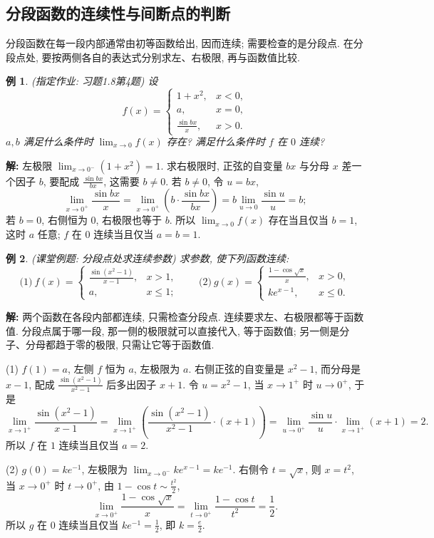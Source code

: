 \documentclass[UTF8,openany]{ctexbook}
\theoremstyle{chinesetextbook}
\newtheorem{example}{例}[section]
\newenvironment{cnsolution}{\par\indent\textbf{解:} \ignorespaces}{\par}
\begin{document}
\subsection{分段函数的连续性与间断点的判断}
分段函数在每一段内部通常由初等函数给出, 因而连续; 需要检查的是分段点. 在分段点处, 要按两侧各自的表达式分别求左、右极限, 再与函数值比较.
\begin{example}
\textnormal{(指定作业: 习题1.8第4题)} 设
\[
f(x)=\begin{cases}1+x^2,&x<0,\\a,&x=0,\\\frac{\sin bx}x,&x>0.\end{cases}
\]
$a,b$ 满足什么条件时 $\displaystyle\lim_{x\to0}f(x)$ 存在? 满足什么条件时 $f$ 在 $0$ 连续?
\end{example}
\begin{cnsolution}
左极限 $\displaystyle\lim_{x\to0^-}(1+x^2)=1$. 求右极限时, 正弦的自变量 $bx$ 与分母 $x$ 差一个因子 $b$, 要配成 $\displaystyle\frac{\sin bx}{bx}$, 这需要 $b\ne0$. 若 $b\ne0$, 令 $u=bx$,
\[
\lim_{x\to0^+}\frac{\sin bx}x=\lim_{x\to0^+}\left(b\cdot\frac{\sin bx}{bx}\right)=b\lim_{u\to0}\frac{\sin u}u=b;
\]
若 $b=0$, 右侧恒为 $0$, 右极限也等于 $b$. 所以 $\displaystyle\lim_{x\to0}f(x)$ 存在当且仅当 $b=1$, 这时 $a$ 任意; $f$ 在 $0$ 连续当且仅当 $a=b=1$.
\end{cnsolution}
\begin{example}
\textnormal{(课堂例题: 分段点处求连续参数)} 求参数, 使下列函数连续:
\[
\text{(1)}\ f(x)=\begin{cases}\frac{\sin(x^2-1)}{x-1},&x>1,\\a,&x\le1;\end{cases}\qquad\text{(2)}\ g(x)=\begin{cases}\frac{1-\cos\sqrt x}x,&x>0,\\ke^{x-1},&x\le0.\end{cases}
\]
\end{example}
\begin{cnsolution}
两个函数在各段内部都连续, 只需检查分段点. 连续要求左、右极限都等于函数值. 分段点属于哪一段, 那一侧的极限就可以直接代入, 等于函数值; 另一侧是分子、分母都趋于零的极限, 只需让它等于函数值.

(1) $f(1)=a$, 左侧 $f$ 恒为 $a$, 左极限为 $a$. 右侧正弦的自变量是 $x^2-1$, 而分母是 $x-1$, 配成 $\displaystyle\frac{\sin(x^2-1)}{x^2-1}$ 后多出因子 $x+1$. 令 $u=x^2-1$, 当 $x\to1^+$ 时 $u\to0^+$, 于是
\[
\lim_{x\to1^+}\frac{\sin(x^2-1)}{x-1}=\lim_{x\to1^+}\left(\frac{\sin(x^2-1)}{x^2-1}\cdot(x+1)\right)=\lim_{u\to0^+}\frac{\sin u}u\cdot\lim_{x\to1^+}(x+1)=2.
\]
所以 $f$ 在 $1$ 连续当且仅当 $a=2$.

(2) $g(0)=ke^{-1}$, 左极限为 $\displaystyle\lim_{x\to0^-}ke^{x-1}=ke^{-1}$. 右侧令 $t=\sqrt x$, 则 $x=t^2$, 当 $x\to0^+$ 时 $t\to0^+$, 由 $\displaystyle1-\cos t\sim\frac{t^2}2$,
\[
\lim_{x\to0^+}\frac{1-\cos\sqrt x}x=\lim_{t\to0^+}\frac{1-\cos t}{t^2}=\frac12.
\]
所以 $g$ 在 $0$ 连续当且仅当 $\displaystyle ke^{-1}=\frac12$, 即 $\displaystyle k=\frac e2$.
\end{cnsolution}
\end{document}
